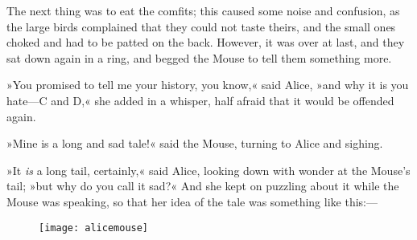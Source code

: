 The next thing was to eat the comfits; this caused some noise and confusion, as the large birds complained that they could not taste theirs, and the small ones choked and had to be patted on the back. However, it was over at last, and they sat down again in a ring, and begged the Mouse to tell them something more.

»You promised to tell me your history, you know,« said Alice, »and why it is you hate—C and D,« she added in a whisper, half afraid that it would be offended again.

»Mine is a long and sad tale!« said the Mouse, turning to Alice and sighing.

»It \textit{is} a long tail, certainly,« said Alice, looking down with wonder at the Mouse's tail; »but why do you call it sad?« And she kept on puzzling about it while the Mouse was speaking, so that her idea of the tale was something like this:—

\vfill
\begin{figure}[h!]
\centering
\texttt{[image: alicemouse]}
\end{figure}
\vfill

\clearpage





